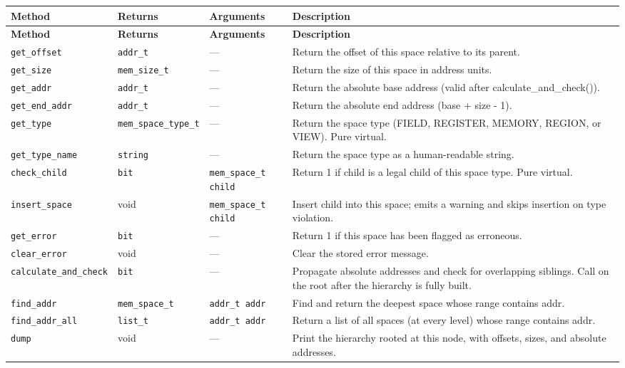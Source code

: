 \documentclass[11pt,letterpaper]{report}
\begin{document}
\begin{xltabular}{\linewidth}{lllX}
\toprule
\textbf{Method} & \textbf{Returns} & \textbf{Arguments} & \textbf{Description} \\
\midrule
\endfirsthead
\toprule
\textbf{Method} & \textbf{Returns} & \textbf{Arguments} & \textbf{Description} \\
\midrule
\endhead
\bottomrule
\endlastfoot
\texttt{get\_offset} & \texttt{addr\_t} & --- & Return the offset of this space relative to its parent. \\
\texttt{get\_size} & \texttt{mem\_size\_t} & --- & Return the size of this space in address units. \\
\texttt{get\_addr} & \texttt{addr\_t} & --- & Return the absolute base address (valid after calculate\_and\_check()). \\
\texttt{get\_end\_addr} & \texttt{addr\_t} & --- & Return the absolute end address (base + size - 1). \\
\texttt{get\_type} & \texttt{mem\_space\_type\_t} & --- & Return the space type (FIELD, REGISTER, MEMORY, REGION, or VIEW). Pure virtual. \\
\texttt{get\_type\_name} & \texttt{string} & --- & Return the space type as a human-readable string. \\
\texttt{check\_child} & \texttt{bit} & \texttt{mem\_space\_t child} & Return 1 if child is a legal child of this space type. Pure virtual. \\
\texttt{insert\_space} & void & \texttt{mem\_space\_t child} & Insert child into this space; emits a warning and skips insertion on type violation. \\
\texttt{get\_error} & \texttt{bit} & --- & Return 1 if this space has been flagged as erroneous. \\
\texttt{clear\_error} & void & --- & Clear the stored error message. \\
\texttt{calculate\_and\_check} & \texttt{bit} & --- & Propagate absolute addresses and check for overlapping siblings. Call on the root after the hierarchy is fully built. \\
\texttt{find\_addr} & \texttt{mem\_space\_t} & \texttt{addr\_t addr} & Find and return the deepest space whose range contains addr. \\
\texttt{find\_addr\_all} & \texttt{list\_t} & \texttt{addr\_t addr} & Return a list of all spaces (at every level) whose range contains addr. \\
\texttt{dump} & void & --- & Print the hierarchy rooted at this node, with offsets, sizes, and absolute addresses. \\
\end{xltabular}
\end{document}
